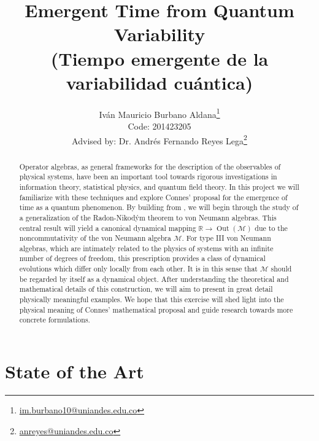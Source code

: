 \documentclass{article}
\title{Emergent Time from Quantum Variability\\{\small (Tiempo emergente de la variabilidad cuántica)}}
\author{Iván Mauricio Burbano Aldana\thanks{\href{mailto:im.burbano10@uniandes.edu.co}{im.burbano10@uniandes.edu.co}}\\
Code: 201423205
\\Advised by: Dr. Andrés Fernando Reyes Lega\thanks{\href{mailto:anreyes@uniandes.edu.co}{anreyes@uniandes.edu.co}}}
\affil{Departamento de F\'{i}sica, Universidad de los Andes,  A.A. 4976-12340, Bogot\'a, Colombia}
\DeclareMathOperator{\Out}{Out}
\begin{document}

\maketitle

\begin{abstract}

Operator algebras, as general frameworks for the description of the observables of physical systems, have been an important tool towards rigorous investigations in information theory, statistical physics, and quantum field theory\cite{Ohya1993, Bratteli1987, Bratteli1997, Connes2008}. In this project we will familiarize with these techniques and explore Connes' proposal for the emergence of time as a quantum phenomenon\cite{Connes2015}. By building from \cite{Burbano2017}, we will begin through the study of a generalization of the Radon-Nikod\'ym theorem to von Neumann algebras\cite{Connes1973}. This central result will yield a canonical dynamical mapping $\mathbb{R}\rightarrow\Out(\mathcal{M})$ due to the noncommutativity of the von Neumann algebra $\mathcal{M}$. For type III von Neumann algebras, which are intimately related to the physics of systems with an infinite number of degrees of freedom\cite{Yngvason2004}, this prescription provides a class of dynamical evolutions which differ only locally from each other. It is in this sense that $\mathcal{M}$ should be regarded by itself as a dynamical object. After understanding the theoretical and mathematical details of this construction, we will aim to present in great detail physically meaningful examples. We hope that this exercise will shed light into the physical meaning of Connes' mathematical proposal and guide research towards more concrete formulations.

\end{abstract}

\section{State of the Art}
\end{document}

